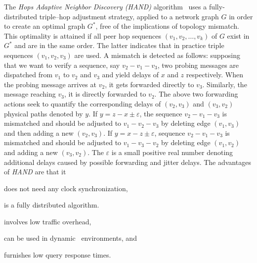 The \emph{Hops Adaptive Neighbor Discovery (HAND)} algorithm~\cite{CLZHC2006}
uses a fully-distributed triple--hop adjustment strategy, applied to a network
graph $G$ in order to create an optimal graph $G^{*}$, free of the implications
of topology mismatch. This optimality is attained if all peer hop 
sequences $(v_1, v_2, \ldots, v_k)$ of $G$ exist in $G^{*}$ and are in the same
order. The latter indicates that in practice triple sequences $(v_1, v_2, v_3)$
are used. A mismatch is detected as follows: supposing that we want to verify
a sequence, say $v_2-v_1-v_3$, two probing messages are dispatched from $v_1$ to
$v_2$ and $v_3$ and yield delays of $x$ and $z$ respectively.
%
When the probing message arrives at $v_2$, it gets forwarded
directly to $v_3$. 
Similarly, the message reaching $v_3$, it is directly forwarded to $v_2$.
The above two forwarding actions seek to quantify 
the corresponding delays of $(v_2,v_3)$ and $(v_3,v_2)$ physical paths
denoted by $y$. 
If $y=z-x\pm\varepsilon$, the sequence $v_2-v_1-v_3$ is mismatched and should
be adjusted to $v_1-v_2-v_3$ by deleting edge $(v_1,v_3)$ and 
then adding a new $(v_2,v_3)$. 
If $y=x-z\pm\varepsilon$, sequence $v_2-v_1-v_3$ is mismatched and
should be adjusted to $v_1-v_3-v_2$ by deleting edge $(v_1,v_2)$ and adding a
new $(v_3,v_2)$. 
The  $\varepsilon$ is a small positive real number denoting
additional delays caused by possible forwarding and jitter delays. 
The advantages of \emph{HAND} are that it
\begin{inparaenum}
  \item does not need any clock synchronization,
  \item is a fully distributed algorithm.
  \item involves low traffic overhead,
  \item can be used in dynamic \p\ environments, and 
  \item furnishes low query response times.
\end{inparaenum}
%
%
